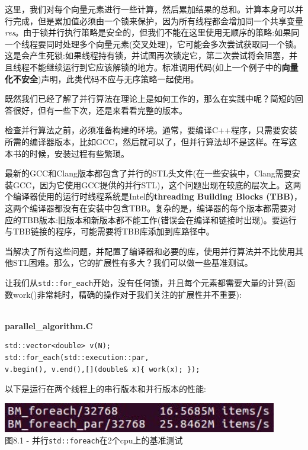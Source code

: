 这里，我们对每个向量元素进行一些计算，然后累加结果的总和。计算本身可以并行完成，但是累加值必须由一个锁来保护，因为所有线程都会增加同一个共享变量\textit{res}。由于锁并行执行策略是安全的，但我们不能在这里使用无顺序的策略:如果同一个线程要同时处理多个向量元素(交叉处理)，它可能会多次尝试获取同一个锁。这是会产生死锁:如果线程持有锁，并试图再次锁定它，第二次尝试将会阻塞，并且线程不能继续运行到它应该解锁的地方。标准调用代码(如上一个例子中的\textbf{向量化不安全})声明，此类代码不应与无序策略一起使用。 

既然我们已经了解了并行算法在理论上是如何工作的，那么在实践中呢？简短的回答很好，但有一些下次，还是来看看完整的版本。

检查并行算法之前，必须准备构建的环境。通常，要编译C++程序，只需要安装所需的编译器版本，比如GCC，然后就可以了，但并行算法却不是这样。在写这本书的时候，安装过程有些繁琐。

最新的GCC和Clang版本都包含了并行的STL头文件(在一些安装中，Clang需要安装GCC，因为它使用GCC提供的并行STL)，这个问题出现在较底的层次上。这两个编译器使用的运行时线程系统是Intel的\textbf{threading Building Blocks (TBB)}，这两个编译器都没有在安装中包含TBB。复杂的是，编译器的每个版本都需要对应的TBB版本:旧版本和新版本都不能工作(错误会在编译和链接时出现)。要运行与TBB链接的程序，可能需要将TBB库添加到库路径中。

当解决了所有这些问题，并配置了编译器和必要的库，使用并行算法并不比使用其他STL困难。那么，它的扩展性有多大？我们可以做一些基准测试。 

让我们从\texttt{std::for\_each}开始，没有任何锁，并且每个元素都需要大量的计算(函数work()非常耗时，精确的操作对于我们关注的扩展性并不重要):

\hspace*{\fill} \\ %
\noindent
\textbf{parallel\_algorithm.C}
\begin{lstlisting}[style=styleCXX]
std::vector<double> v(N);
std::for_each(std::execution::par,
v.begin(), v.end(),[](double& x){ work(x); });
\end{lstlisting}

以下是运行在两个线程上的串行版本和并行版本的性能:

\begin{center}
\includegraphics[width=0.9\textwidth]{content/2/chapter8/images/1.jpg}\\
图8.1 - 并行\texttt{std::foreach}在2个cpu上的基准测试
\end{center}

